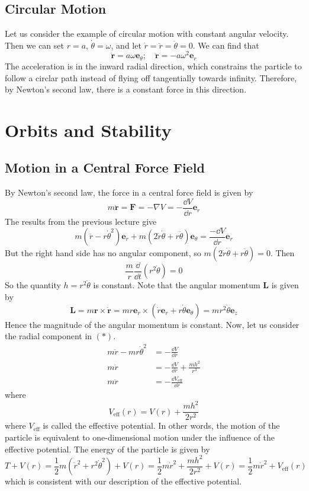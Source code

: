 \documentclass{article}
\begin{document}
\subsection{Circular Motion}
Let us consider the example of circular motion with constant angular velocity. Then we can set $r = a$, $\dot\theta = \omega$, and let $\dot r = \ddot r = \ddot \theta = 0$. We can find that
\[ \dot {\bm r} = a \omega \bm e_\theta ;\quad \ddot{\bm r} = -a\omega^2 \bm e_r \]
The acceleration is in the inward radial direction, which constrains the particle to follow a circlar path instead of flying off tangentially towards infinity. Therefore, by Newton's second law, there is a constant force in this direction.

\section{Orbits and Stability}
\subsection{Motion in a Central Force Field}
By Newton's second law, the force in a central force field is given by
\[ m\ddot{\bm r} = \bm F = -\nabla V = -\frac{\dd V}{\dd r} \bm e_r \]
The results from the previous lecture give
\begin{equation}
    m\left(\ddot r - r\dot\theta^2\right) \bm e_r + m\left(2\dot r \dot \theta + r \ddot \theta\right) \bm e_\theta = \frac{-\dd V}{\dd r} \bm e_r \tag{$\ast$}
\end{equation}
But the right hand side has no angular component, so $m\left(2\dot r \dot \theta + r \ddot \theta\right) = 0$. Then
\[ \frac{m}{r} \frac{\dd}{\dd t}\left(r^2 \dot\theta\right) = 0 \]
So the quantity $h = r^2 \dot\theta$ is constant. Note that the angular momentum $\bm L$ is given by
\[ \bm L = m\bm r \times \dot{\bm r} = mr\bm e_r \times \left( \dot r\bm e_r + r\dot\theta \bm e_\theta \right) = mr^2 \dot\theta \bm e_z \]
Hence the magnitude of the angular momentum is constant. Now, let us consider the radial component in $(\ast)$.
\begin{align*}
    m\ddot r - mr\dot\theta^2 & = -\frac{\dd V}{\dd r}                    \\
    m\ddot r                  & = -\frac{\dd V}{\dd r} + \frac{mh^2}{r^3} \\
    m\ddot r                  & = -\frac{\dd V_\text{eff}}{\dd r}
\end{align*}
where
\[ V_\text{eff}(r) = V(r) + \frac{mh^2}{2r^2} \]
where $V_\text{eff}$ is called the effective potential. In other words, the motion of the particle is equivalent to one-dimensional motion under the influence of the effective potential. The energy of the particle is given by
\[ T + V(r) = \frac{1}{2}m\left( \dot r^2 + r^2 \dot\theta^2 \right) + V(r) = \frac{1}{2}m\dot r^2 + \frac{mh^2}{2r^2} + V(r) = \frac{1}{2}m\dot r^2 + V_\text{eff}(r) \]
which is consistent with our description of the effective potential.
\end{document}
